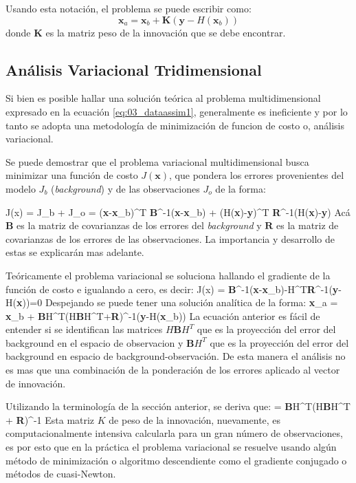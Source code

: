 Usando esta notación, el problema se puede escribir como:
\begin{equation}\label{eq:03_dataassim1}
	\mathbf{x}_a = \mathbf{x}_b + \mathbf{K}(\mathbf{y} - H(\mathbf{x}_b))
\end{equation}
donde $\mathbf{K}$ es la matriz peso de la innovación que se debe encontrar.
\subsection{Análisis Variacional Tridimensional}

Si bien es posible hallar una solución teórica al problema multidimensional expresado en la ecuación \ref{eq:03_dataassim1}, generalmente es ineficiente y por lo tanto se adopta una metodología de minimización de funcion de costo o, análisis variacional.

Se puede demostrar \cite{warner2010numerical} que el problema variacional multidimensional busca minimizar una función de costo $J(\mathbf{x})$, que pondera los errores provenientes del modelo $J_b$ (\emph{background}) y de las observaciones $J_o$ de la forma:

\be 
J(x) = J_b + J_o = (\textbf{x}-\textbf{x}_b)^T \textbf{B}^{-1}(\textbf{x}-\textbf{x}_b) + (H(\textbf{x})-\textbf{y})^T \textbf{R}^{-1}(H(\textbf{x})-\textbf{y})
\ee 
Acá $\textbf{B}$ es la matriz de covarianzas de los errores del \emph{background} y $\textbf{R}$ es la matriz de covarianzas de los errores de las observaciones. La importancia y desarrollo de estas se explicarán mas adelante.

Teóricamente el problema variacional se soluciona hallando el gradiente de la función de costo e igualando a cero, es decir:
\be 
\nabla J(x) = \textbf{B}^{-1}(\textbf{x}-\textbf{x}_b)-H^T\textbf{R}^{-1}(\textbf{y}-H(\textbf{x}))=0
\ee
Despejando se puede tener una solución analítica de la forma:
\be \label{eq:03_dataassim}
\textbf{x}_a = \textbf{x}_b + \textbf{B}H^T(H\textbf{B}H^T+\textbf{R})^{-1}(\textbf{y}-H(\textbf{x}_b)) 
\ee
La ecuación anterior es fácil de entender si se identifican las matrices $H\textbf{B}H^T$ que es la proyección del error del background en el espacio de observacion y $\textbf{B}H^T$ que es la proyección del error del background en espacio de background-observación. De esta manera el análisis no es mas que una combinación de la ponderación de los errores aplicado al vector de innovación.

Utilizando la terminología de la sección anterior, se deriva que:
\be
{} = \textbf{B}H^{T}(H\textbf{B}H^T + \textbf{R})^{-1}
\ee 
Esta matriz $K$ de peso de la innovación, nuevamente, es computacionalmente intensiva calcularla para un gran número de observaciones, es por esto que en la práctica el problema variacional se resuelve usando algún método de minimización o algoritmo descendiente como el gradiente conjugado o métodos de cuasi-Newton.
